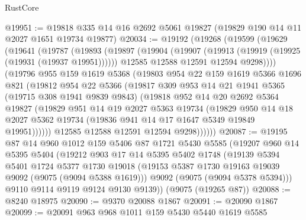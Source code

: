 \begin{lexlean}{RustCore}
\begin{coremodule}
@19951 := @19818 @335 @14 @16 @2692 @5061 @19827 (@19829 @190 @14 @11 @2027 @1651 @19734 @19877)
@20034 := @19192
    (@19268
      (@19599
        (@19629
          (@19641
            (@19787
              (@19893
                (@19897
                  (@19904
                    (@19907 (@19913 (@19919 (@19925 (@19931 (@19937 @19951))))))
                    @12585
                    @12588
                    @12591
                    @12594
                    @9298))))
            (@19796
              @955
              @159
              @1619
              @5368
              (@19803
                @954
                @22
                @159
                @1619
                @5366
                @1696
                @821
                (@19812
                  @954
                  @22
                  @5366
                  (@19817
                    @309
                    @953
                    @14
                    @21
                    @1941
                    @5365
                    (@19715 @308 @1941 @9839 @9843)
                    (@19818
                      @952
                      @14
                      @20
                      @2692
                      @5364
                      @19827
                      (@19829
                        @951
                        @14
                        @19
                        @2027
                        @5363
                        @19734
                        (@19829
                          @950
                          @14
                          @18
                          @2027
                          @5362
                          @19734
                          (@19836 @941 @14 @17 @1647 @5349 @19849 @19951))))))
                @12585
                @12588
                @12591
                @12594
                @9298))))))
@20087 := @19195
    @87
    @14
    @960
    @1012
    @159
    @5406
    @87
    @1721
    @5430
    @5585
    (@19207
      @960
      @14
      @5395
      @5404
      (@19212
        @903
        @17
        @14
        @5395
        @5402
        @1748
        (@19139
          @5394
          @5401
          @1724
          @5377
          @1730
          @19018
          (@19153 @5387 @1730 @19163 @19039 @9092 (@9075 (@9094 @5388 @1619)))
          @9092
          (@9075 (@9094 @5378 @5394)))
        @9110
        @9114
        @9119
        @9124
        @9130
        @9139))
    (@9075 (@19265 @87))
@20088 := @8240 @18975
@20090 := @9370 @20088 @1867
@20091 := @20090 @1867
@20099 := @20091 @963 @968 @1011 @159 @5430 @5440 @1619 @5585

\end{coremodule}
\end{lexlean}
